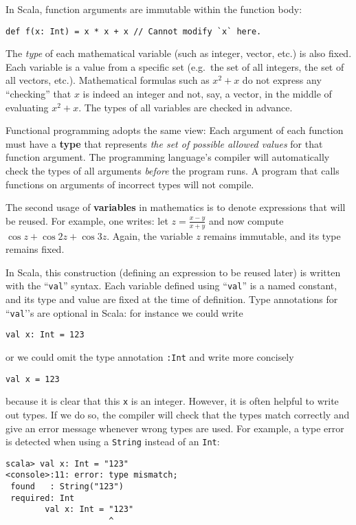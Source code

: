 In Scala, function arguments are immutable within the function body:
\begin{lstlisting}
def f(x: Int) = x * x + x // Cannot modify `x` here.
\end{lstlisting}

The \emph{type} of each mathematical variable (such as integer, vector,
etc.) is also fixed. Each variable is a value from a specific set
(e.g.~the set of all integers, the set of all vectors, etc.). Mathematical
formulas such as $x^{2}+x$ do not express any \textsf{``}checking\textsf{''} that
$x$ is indeed an integer and not, say, a vector, in the middle of
evaluating $x^{2}+x$. The types of all variables are checked in advance.

Functional programming adopts the same view: Each argument of each
function must have a \textbf{type} that represents \emph{the
set of possible allowed values} for that function argument. The programming
language\textsf{'}s compiler will automatically check the types of all arguments
\emph{before} the program runs. A program that calls functions on
arguments of incorrect types will not compile.

The second usage of \textbf{variables} in mathematics
is to denote expressions that will be reused. For example, one writes:
let $z=\frac{x-y}{x+y}$ and now compute $\cos z+\cos2z+\cos3z$.
Again, the variable $z$ remains immutable, and its type remains fixed.

In Scala, this construction (defining an expression to be reused later)
is written with the \textsf{``}\lstinline!val!\textsf{''} syntax. Each variable defined
using \textsf{``}\lstinline!val!\textsf{''} is a named constant, and its type and
value are fixed at the time of definition. Type annotations for \textsf{``}\lstinline!val!'\textsf{'}s
are optional in Scala: for instance we could write 
\begin{lstlisting}
val x: Int = 123
\end{lstlisting}
or we could omit the type annotation \lstinline!:Int! and write more
concisely
\begin{lstlisting}
val x = 123
\end{lstlisting}
because it is clear that this \texttt{}\lstinline!x! is an integer.
However, it is often helpful to write out types. If we do so, the
compiler will check that the types match correctly and give an error
message whenever wrong types are used. For example, a type error is
detected when using a \lstinline!String! instead of an \lstinline!Int!:
\begin{lstlisting}
scala> val x: Int = "123"
<console>:11: error: type mismatch;
 found   : String("123")
 required: Int
        val x: Int = "123"
                     ^
\end{lstlisting}



